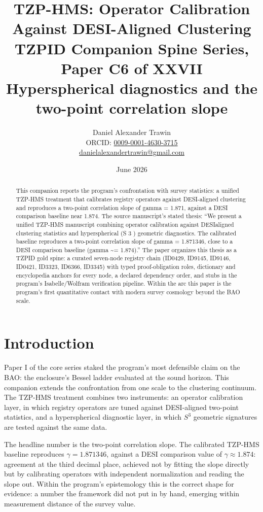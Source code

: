 \documentclass[11pt]{article}
\title{TZP-HMS: Operator Calibration Against DESI-Aligned Clustering\\[0.6em]
\large TZPID Companion Spine Series, Paper C6 of XXVII\\
\normalsize Hyperspherical diagnostics and the two-point correlation slope}
\author{Daniel Alexander Trawin\\
\small ORCID: \href{https://orcid.org/0009-0001-4630-3715}{0009-0001-4630-3715}\\
\small \href{mailto:danielalexandertrawin@gmail.com}{danielalexandertrawin@gmail.com}}
\date{June 2026}
\theoremstyle{remark}
\begin{document}
\maketitle

\begin{abstract}
This companion reports the program's confrontation with survey statistics: a unified TZP-HMS treatment that calibrates registry operators against DESI-aligned clustering and reproduces a two-point correlation slope of gamma = 1.871, against a DESI comparison baseline near 1.874.
The source manuscript's stated thesis: ``We present a unified TZP-HMS manuscript combining operator calibration against DESIaligned clustering statistics and hyperspherical (S 3 ) geometric diagnostics. The calibrated baseline reproduces a two-point correlation slope of gamma = 1.871346, close to a DESI comparison baseline (gamma \textasciitilde{}= 1.874).'' The paper organizes this thesis as a TZPID gold spine: a curated seven-node registry chain (ID0429, ID9145, ID9146, ID0421, ID3323, ID6366, ID3345) with typed proof-obligation roles, dictionary and encyclopedia anchors for every node, a declared dependency order, and stubs in the program's Isabelle/Wolfram verification pipeline. Within the arc this paper is the program's first quantitative contact with modern survey cosmology beyond the BAO scale.
\end{abstract}

\section{Introduction}
\label{sec:intro}

Paper I of the core series staked the program's most defensible claim on the BAO: the enclosure's Bessel ladder evaluated at the sound horizon. This companion extends the confrontation from one scale to the clustering continuum. The TZP-HMS treatment combines two instruments: an operator calibration layer, in which registry operators are tuned against DESI-aligned two-point statistics, and a hyperspherical diagnostic layer, in which $S^3$ geometric signatures are tested against the same data.

The headline number is the two-point correlation slope. The calibrated TZP-HMS baseline reproduces $\gamma = 1.871346$, against a DESI comparison value of $\gamma \approx 1.874$: agreement at the third decimal place, achieved not by fitting the slope directly but by calibrating operators with independent normalization and reading the slope out. Within the program's epistemology this is the correct shape for evidence: a number the framework did not put in by hand, emerging within measurement distance of the survey value.
\end{document}
